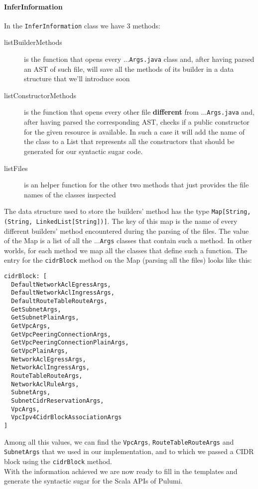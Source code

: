 \paragraph{InferInformation}
In the \texttt{InferInformation} class we have 3 methods:
\begin{description}
  \item[listBuilderMethods] is the function that opens every ...\texttt{Args.java} class and, after having parsed an AST of such file, will save all the methods of its builder in a data structure that we'll introduce soon
  \item[listConstructorMethods] is the function that opens every other file \textbf{different} from ...\texttt{Args.java} and, after having parsed the corresponding AST, checks if a public constructor for the given resource is available. In such a case it will add the name of the class to a List that represents all the constructors that should be generated for our syntactic sugar code.
  \item[listFiles] is an helper function for the other two methods that just provides the file names of the classes inspected
\end{description}
The data structure used to store the builders' method has the type \texttt{Map[String, (String, LinkedList[String])]}.
The key of this map is the name of every different builders' method encountered during the parsing of the files.
The value of the Map is a list of all the ...\texttt{Args} classes that contain such a method.
In other worlds, for each method we map all the classes that define such a function.
The entry for the \texttt{cidrBlock} method on the Map (parsing all the files) looks like this:
\begin{verbatim}
cidrBlock: [
  DefaultNetworkAclEgressArgs,
  DefaultNetworkAclIngressArgs,
  DefaultRouteTableRouteArgs,
  GetSubnetArgs,
  GetSubnetPlainArgs,
  GetVpcArgs,
  GetVpcPeeringConnectionArgs,
  GetVpcPeeringConnectionPlainArgs,
  GetVpcPlainArgs,
  NetworkAclEgressArgs,
  NetworkAclIngressArgs,
  RouteTableRouteArgs,
  NetworkAclRuleArgs,
  SubnetArgs,
  SubnetCidrReservationArgs,
  VpcArgs,
  VpcIpv4CidrBlockAssociationArgs
]
\end{verbatim}
Among all this values, we can find the \texttt{VpcArgs}, \texttt{RouteTableRouteArgs} and \texttt{SubnetArgs} that we used in our implementation, and to which we passed a CIDR block using the \texttt{cidrBlock} method.\\
With the information achieved we are now ready to fill in the templates and generate the syntactic sugar for the Scala APIs of Pulumi.

